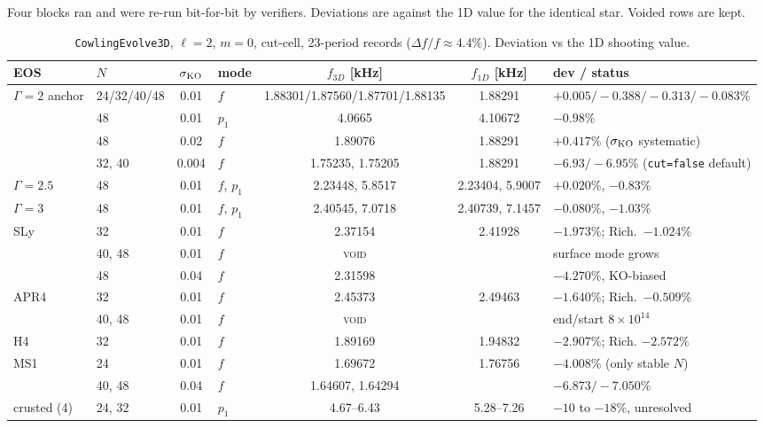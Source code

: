 \documentclass[aps,prd,preprint,amsmath,amssymb,nofootinbib,longbibliography]{revtex4-2}
\newcommand{\void}{\textsc{void}}
\begin{document}
Four blocks ran and were re-run bit-for-bit by verifiers. Deviations are against the 1D value
for the identical star. Voided rows are kept.

\begin{table}[htbp]
\caption{\texttt{CowlingEvolve3D}, $\ell=2$, $m=0$, cut-cell, 23-period records
($\Delta f/f\approx4.4\%$). Deviation vs the 1D shooting value.}
\label{tab:lin3d}
\scriptsize
\begin{ruledtabular}
\begin{tabular}{llclccl}
EOS & $N$ & $\sigma_{\rm KO}$ & mode & $f_{3D}$ [kHz] & $f_{1D}$ [kHz] & dev / status\\
\hline
$\Gamma=2$ anchor & 24/32/40/48 & 0.01 & $f$ & 1.88301/1.87560/1.87701/1.88135 & 1.88291 & $+0.005/-0.388/-0.313/-0.083\%$\\
 & 48 & 0.01 & $p_1$ & 4.0665 & 4.10672 & $-0.98\%$\\
 & 48 & 0.02 & $f$ & 1.89076 & 1.88291 & $+0.417\%$ ($\sigma_{\rm KO}$ systematic)\\
 & 32, 40 & 0.004 & $f$ & 1.75235, 1.75205 & 1.88291 & $-6.93/-6.95\%$ (\texttt{cut=false} default)\\
$\Gamma=2.5$ & 48 & 0.01 & $f$, $p_1$ & 2.23448, 5.8517 & 2.23404, 5.9007 & $+0.020\%$, $-0.83\%$\\
$\Gamma=3$   & 48 & 0.01 & $f$, $p_1$ & 2.40545, 7.0718 & 2.40739, 7.1457 & $-0.080\%$, $-1.03\%$\\
SLy  & 32 & 0.01 & $f$ & 2.37154 & 2.41928 & $-1.973\%$; Rich.\ $-1.024\%$\\
     & 40, 48 & 0.01 & $f$ & \void & & surface mode grows\\
     & 48 & 0.04 & $f$ & 2.31598 & & $-4.270\%$, KO-biased\\
APR4 & 32 & 0.01 & $f$ & 2.45373 & 2.49463 & $-1.640\%$; Rich.\ $-0.509\%$\\
     & 40, 48 & 0.01 & $f$ & \void & & end/start $8\times10^{14}$\\
H4   & 32 & 0.01 & $f$ & 1.89169 & 1.94832 & $-2.907\%$; Rich. $-2.572\%$\\
MS1  & 24 & 0.01 & $f$ & 1.69672 & 1.76756 & $-4.008\%$ (only stable $N$)\\
     & 40, 48 & 0.04 & $f$ & 1.64607, 1.64294 & & $-6.873/-7.050\%$\\
crusted (4) & 24, 32 & 0.01 & $p_1$ & 4.67--6.43 & 5.28--7.26 & $-10$ to $-18\%$, unresolved\\
\end{tabular}
\end{ruledtabular}
\end{table}
\end{document}
